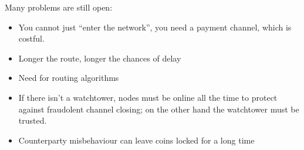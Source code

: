 Many problems are still open:
\begin{itemize}
   \item You cannot just ``enter the network'', you need a payment channel, which is costful.
   \item Longer the route, longer the chances of delay
   \item Need for routing algorithms
   \item If there isn't a watchtower, nodes must be online all the time to protect against fraudolent channel closing; on the other hand the watchtower must be trusted.
   \item Counterparty misbehaviour can leave coins locked for a long time
\end{itemize}